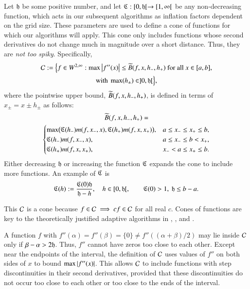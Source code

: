 \documentclass[review]{elsarticle}
\makeatletter
\newcommand{\Vast}{\bBigg@{6}}
\theoremstyle{definition}
\newcommand{\Vastr}{\mathclose\Vast}
\renewcommand{\cw}{W}
\makeatother
\begin{document}
Let $\mathfrak{h}$ be some positive number, and let $\mathfrak{C} : [0,\mathfrak{h}[ \to [1,\infty[$ be any
non-decreasing function, which acts in our subsequent algorithms as inflation factors dependent on the grid size.
These parameters are used to define a cone of functions for which our algorithms will
apply.  This cone only includes functions whose second derivatives do not change much in
magnitude over a short distance.  Thus, they are \emph{not too spiky}.  Specifically,
\begin{multline} \label{conedef}
 \cc :=   \Bigl \{
 f  \in    \cw^{2,\infty}:   \max\abs{f''(x)}  \le \tB(f,x,h_-,h_+)  \text{ for all } x \in [a,b],
\\ \text{with }  \max(h_{\pm}) \in ]0, \fh[  \Bigr \},
\end{multline}
where the pointwise upper bound, $\widetilde{B}(f,x,h_-,h_+)$, is defined in terms of $x_{\pm} =x \pm h_{\pm}$ as follows:
\begin{multline*}
\tB(f,x,h_-,h_+)=\\
\begin{cases}
  \max\bigl(\fC(h_{-}) m(f,x_-,x),\fC(h_{+}) m(f,x,x_+)\bigr), & a \le x_- \le x_+ \le b,\\
\fC(h_{-}) m(f,x_-,x), & a \le x_- \le b <  x_+,\\
\fC(h_{+}) m(f,x,x_+), & x_- < a \le x_+ \le b.
\end{cases} %
\end{multline*}
Either decreasing $\mathfrak{h}$ or increasing the function $\mathfrak{C}$ expands the cone to include more functions.  An example of $\mathfrak{C}$ is
\begin{equation} \label{sampleC}
\mathfrak{C}(h) : = \frac{\mathfrak{C}(0) \mathfrak{h}}{\mathfrak{h} - h}, \quad h \in [0,\mathfrak{h}[, \qquad \mathfrak{C}(0) > 1,\ \mathfrak{h} \le b - a.
\end{equation}

This $\mathcal{C}$ is a cone because $f \in \mathcal{C} \implies cf \in \mathcal{C}$ for all real
$c$. Cones of
functions are key to the theoretically justified adaptive algorithms in
\cite{HicEtal14b}, \cite{Ton14a}, and \cite{Din15a}.

A function $f$ with $f''(\alpha) = f''(\beta) = \{0\} \ne f''((\alpha+\beta)/2)$ may
lie inside $\mathcal{C}$ only if $\beta - \alpha > 2\mathfrak{h}$. Thus, $f''$ cannot have zeros too close to each other.  Except near the endpoints of
the interval, the definition of $\mathcal{C}$ uses values of $f''$ on both sides of $x$
to bound $\max \left \lvert f''(x) \right \rvert$. This allows $\mathcal{C}$ to include functions with step
discontinuities in their second derivatives, provided that these discontinuities
do not occur too close to each other or too close to the ends of the interval.
\end{document}
